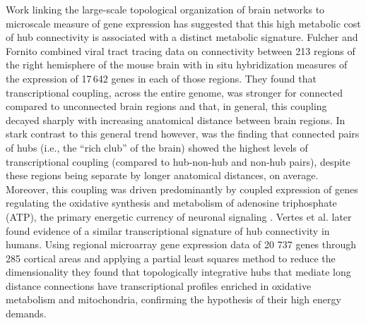 \documentclass[10pt,letterpaper]{article}
\begin{document}
Work linking the large-scale topological organization of brain networks to microscale measure of gene expression has suggested that this high metabolic cost of hub connectivity is associated with a distinct metabolic signature.
Fulcher and Fornito \cite{Fulcher:2016ck} combined viral tract tracing data on connectivity between 213 regions of the right hemisphere of the mouse brain \cite{Oh2014} with in situ hybridization measures of the expression of 17\,642 genes in each of those regions.
They found that transcriptional coupling, across the entire genome, was stronger for connected compared to unconnected brain regions and that, in general, this coupling decayed sharply with increasing anatomical distance between brain regions.
In stark contrast to this general trend however, was the finding that connected pairs of hubs (i.e., the ``rich club'' of the brain) showed the highest levels of transcriptional coupling (compared to hub-non-hub and non-hub pairs), despite these regions being separate by longer anatomical distances, on average.
Moreover, this coupling was driven predominantly by coupled expression of genes regulating the oxidative synthesis and metabolism of adenosine triphosphate (ATP), the primary energetic currency of neuronal signaling \cite{Lennie:2003ia, Laughlin:2003vu}.
Vertes et al. \cite{Vertes2016a} later found evidence of a similar transcriptional signature of hub connectivity in humans. Using regional microarray gene expression data of 20 737 genes through 285 cortical areas and applying a partial least squares method to reduce the dimensionality they found that topologically integrative hubs that mediate long distance connections have transcriptional profiles enriched in oxidative metabolism and mitochondria, confirming the hypothesis of their high energy demands.
\end{document}
